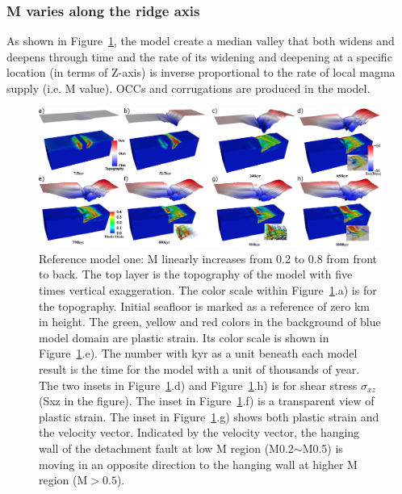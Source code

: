 \subsubsection{M varies along the ridge axis}
As shown in Figure~\ref{fig_Results1_1}, the model create a median valley that both widens and deepens through time and the rate of its widening and deepening at a specific location (in terms of Z-axis) is inverse proportional to the rate of local magma supply (i.e. M value). OCCs and corrugations are produced in the model.
\begin{figure}[H]
  \centering
    \includegraphics[width=1.0\textwidth]{fig_Results1_1.png}
  \caption{Reference model one: M linearly increases from 0.2 to 0.8 from front to back. The top layer is the topography of the model with five times vertical exaggeration. The color scale within Figure~\ref{fig_Results1_1}.a) is for the topography. Initial seafloor is marked as a reference of zero km in height.  The green, yellow and red colors in the background of blue model domain are plastic strain. Its color scale is shown in Figure~\ref{fig_Results1_1}.e). The number with kyr as a unit beneath each model result is the time for the model with a unit of thousands of year. The two insets in Figure~\ref{fig_Results1_1}.d) and Figure~\ref{fig_Results1_1}.h) is for shear stress $\sigma_{xz}$ (Sxz in the figure). The inset in Figure~\ref{fig_Results1_1}.f) is a transparent view of plastic strain. The inset in Figure~\ref{fig_Results1_1}.g) shows both plastic strain and the velocity vector. Indicated by the velocity vector, the hanging wall of the detachment fault at low M region (M0.2$\sim$M0.5) is moving in an opposite direction to the hanging wall at higher M region (M$>0.5$).} %
 \label{fig_Results1_1}
\end{figure}   

